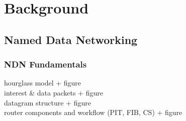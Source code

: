 \chapter{Background} \label{chapter:Background}



\section{Named Data Networking}

\subsection{NDN Fundamentals}

hourglass model + figure \\
interest \& data packets + figure \\
datagram structure + figure \\
router components and workflow (PIT, FIB, CS) + figure \\

